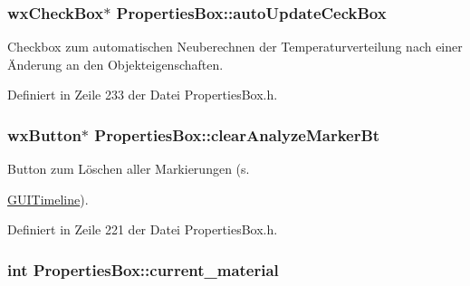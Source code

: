 \hypertarget{classPropertiesBox_aea93bc13aea5197dfe5d53f6c465c0ad}{
\subsubsection[{auto\-Update\-Ceck\-Box}]{\setlength{\rightskip}{0pt plus 5cm}wx\-Check\-Box$\ast$ Properties\-Box\-::auto\-Update\-Ceck\-Box\hspace{0.3cm}{\ttfamily [private]}}}\label{classPropertiesBox_aea93bc13aea5197dfe5d53f6c465c0ad}


Checkbox zum automatischen Neuberechnen der Temperaturverteilung nach einer Änderung an den Objekteigenschaften. 



Definiert in Zeile 233 der Datei Properties\-Box.\-h.

\hypertarget{classPropertiesBox_a93a88ce0e08aee33673b26ae63c7846f}{
\subsubsection[{clear\-Analyze\-Marker\-Bt}]{\setlength{\rightskip}{0pt plus 5cm}wx\-Button$\ast$ Properties\-Box\-::clear\-Analyze\-Marker\-Bt\hspace{0.3cm}{\ttfamily [private]}}}\label{classPropertiesBox_a93a88ce0e08aee33673b26ae63c7846f}


Button zum Löschen aller Markierungen (s. 

\hyperlink{classGUITimeline}{G\-U\-I\-Timeline}). 

Definiert in Zeile 221 der Datei Properties\-Box.\-h.

\hypertarget{classPropertiesBox_a83244ddd61bfd31452a3a975b107becb}{
\subsubsection[{current\-\_\-material}]{\setlength{\rightskip}{0pt plus 5cm}int Properties\-Box\-::current\-\_\-material\hspace{0.3cm}{\ttfamily [private]}}}\label{classPropertiesBox_a83244ddd61bfd31452a3a975b107becb}


